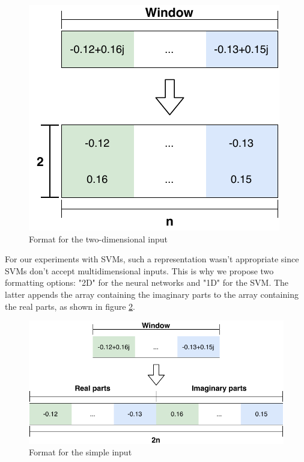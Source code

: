 \begin{figure}[htbp!]
  \centering
  \includegraphics[scale=0.8]{figures/dataprep_2d.pdf}
  \caption{Format for the two-dimensional input}
  \label{fig:2din}
\end{figure}

For our experiments with SVMs, such a representation wasn't appropriate since SVMs don't accept multidimensional inputs. This is why we propose two formatting options: "2D" for the neural networks and "1D" for the SVM. The latter appends the array containing the imaginary parts to the array containing the real parts, as shown in figure \ref{fig:1din}.

\begin{figure}[htbp!]
  \centering
  \includegraphics[scale=0.8]{figures/dataprep_1d.pdf}
  \caption{Format for the simple input}
  \label{fig:1din}
\end{figure}

